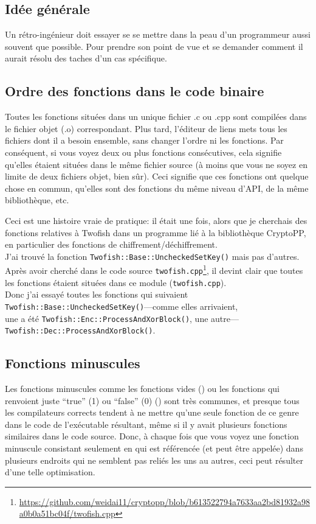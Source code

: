 \subsection{Idée générale}

Un rétro-ingénieur doit essayer se se mettre dans la peau d'un programmeur aussi
souvent que possible.
Pour prendre son point de vue et se demander comment il aurait résolu des taches
d'un cas spécifique.

\subsection{Ordre des fonctions dans le code binaire}

Toutes les fonctions situées dans un unique fichier .c ou .cpp sont compilées dans
le fichier objet (.o) correspondant.
Plus tard, l'éditeur de liens mets tous les fichiers dont il a besoin ensemble, sans
changer l'ordre ni les fonctions.
Par conséquent, si vous voyez deux ou plus fonctions consécutives, cela signifie
qu'elles étaient situées dans le même fichier source (à moins que vous ne soyez en
limite de deux fichiers objet, bien sûr).
Ceci signifie que ces fonctions ont quelque chose en commun, qu'elles sont des fonctions
du même niveau d'\ac{API}, de la même bibliothèque, etc.

Ceci est une histoire vraie de pratique: il était une fois, alors que je cherchais
des fonctions relatives à Twofish dans un programme lié à la bibliothèque CryptoPP,
en particulier des fonctions de chiffrement/déchiffrement.\\
J'ai trouvé la fonction \verb|Twofish::Base::UncheckedSetKey()| mais pas d'autres.
Après avoir cherché dans le code source
\verb|twofish.cpp|\footnote{\url{https://github.com/weidai11/cryptopp/blob/b613522794a7633aa2bd81932a98a0b0a51bc04f/twofish.cpp}},
il devint clair que toutes les fonctions étaient situées dans ce module (\verb|twofish.cpp|).\\
Donc j'ai essayé toutes les fonctions qui suivaient \verb|Twofish::Base::UncheckedSetKey()|---comme elles arrivaient,\\
une a été \verb|Twofish::Enc::ProcessAndXorBlock()|, une autre---\verb|Twofish::Dec::ProcessAndXorBlock()|.

\subsection{Fonctions minuscules}

Les fonctions minuscules comme les fonctions vides ()
ou les fonctions qui renvoient juste ``true'' (1) ou ``false'' (0) ()
sont très communes, et presque tous les compilateurs corrects tendent à ne mettre
qu'une seule fonction de ce genre dans le code de l'exécutable résultant, même si
il y avait plusieurs fonctions similaires dans le code source.
Donc, à chaque fois que vous voyez une fonction minuscule consistant seulement en
 qui est référencée (et peut être appelée) dans plusieurs endroits
qui ne semblent pas reliés les uns au autres, ceci peut résulter d'une telle optimisation.%

